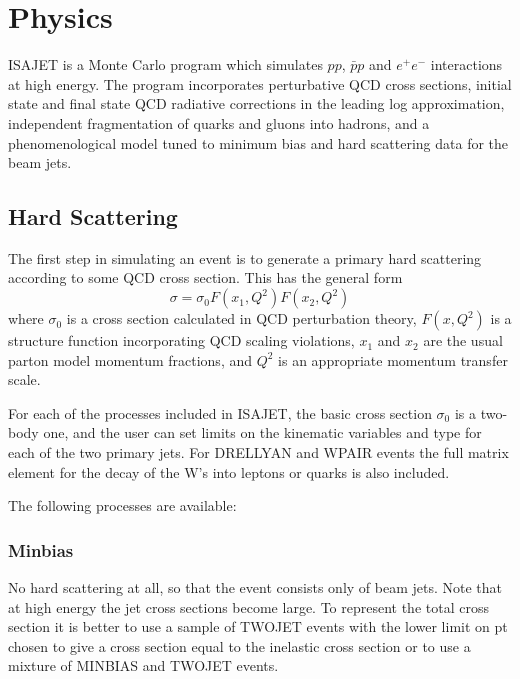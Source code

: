 \newpage
\section{Physics\label{PHYSICS}}

      ISAJET is a Monte Carlo program which simulates $pp$, $\bar pp$
and $e^+e^-$ interactions at high energy. 
The program incorporates
perturbative QCD cross sections, initial state and final state QCD
radiative corrections in the leading log approximation, independent
fragmentation of quarks and gluons into hadrons, and a
phenomenological model tuned to minimum bias and hard scattering data
for the beam jets.

\subsection{Hard Scattering\label{hard}}

      The first step in simulating an event is to generate a primary
hard scattering according to some QCD cross section. This has the
general form
$$
\sigma = \sigma_0  F(x_1,Q^2) F(x_2,Q^2)
$$
where $\sigma_0$ is a cross section calculated in QCD perturbation
theory, $F(x,Q^2)$ is a structure function incorporating QCD scaling
violations, $x_1$ and $x_2$ are the usual parton model momentum
fractions, and $Q^2$ is an appropriate momentum transfer scale.

      For each of the processes included in ISAJET, the basic cross
section $\sigma_0$ is a two-body one, and the user can set limits on
the kinematic variables and type for each of the two primary jets. For
DRELLYAN and WPAIR events the full matrix element for the decay of the
W's into leptons or quarks is also included.

      The following processes are available:

\subsubsection{Minbias} No hard scattering at all, so that the event
consists only of beam jets. Note that at high energy the jet cross
sections become large. To represent the total cross section it is
better to use a sample of TWOJET events with the lower limit on pt
chosen to give a cross section equal to the inelastic cross section or
to use a mixture of MINBIAS and TWOJET events.

